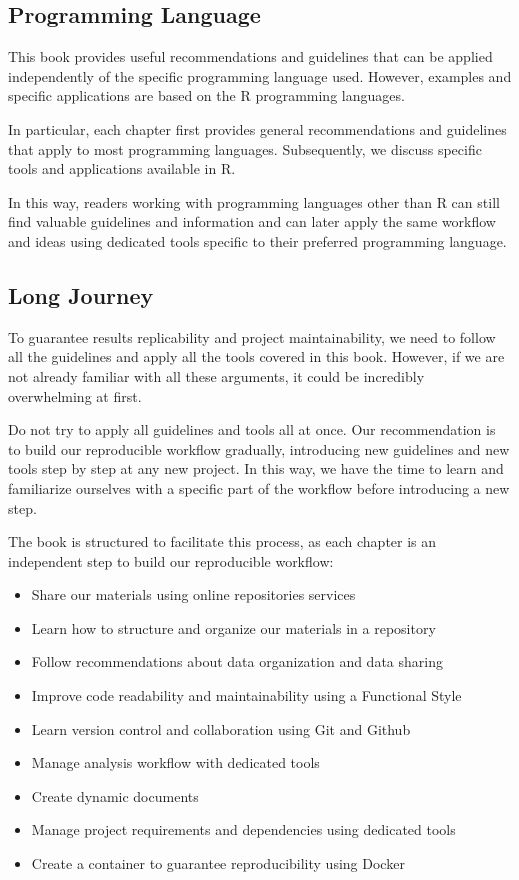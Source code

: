 \documentclass[
  11pt,
]{book}
\providecommand{\tightlist}{%
  \setlength{\itemsep}{0pt}\setlength{\parskip}{0pt}}
\begin{document}
\hypertarget{programming-language}{%
\subsection{Programming Language}\label{programming-language}}

This book provides useful recommendations and guidelines that can be applied independently of the specific programming language used. However, examples and specific applications are based on the R programming languages.

In particular, each chapter first provides general recommendations and guidelines that apply to most programming languages. Subsequently, we discuss specific tools and applications available in R.

In this way, readers working with programming languages other than R can still find valuable guidelines and information and can later apply the same workflow and ideas using dedicated tools specific to their preferred programming language.

\hypertarget{long-journey}{%
\subsection{Long Journey}\label{long-journey}}

To guarantee results replicability and project maintainability, we need to follow all the guidelines and apply all the tools covered in this book. However, if we are not already familiar with all these arguments, it could be incredibly overwhelming at first.

Do not try to apply all guidelines and tools all at once. Our recommendation is to build our reproducible workflow gradually, introducing new guidelines and new tools step by step at any new project. In this way, we have the time to learn and familiarize ourselves with a specific part of the workflow before introducing a new step.

The book is structured to facilitate this process, as each chapter is an independent step to build our reproducible workflow:

\begin{itemize}
\tightlist
\item
  Share our materials using online repositories services
\item
  Learn how to structure and organize our materials in a repository
\item
  Follow recommendations about data organization and data sharing
\item
  Improve code readability and maintainability using a Functional Style
\item
  Learn version control and collaboration using Git and Github
\item
  Manage analysis workflow with dedicated tools
\item
  Create dynamic documents
\item
  Manage project requirements and dependencies using dedicated tools
\item
  Create a container to guarantee reproducibility using Docker
\end{itemize}
\end{document}
